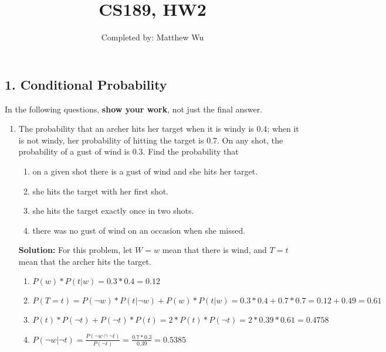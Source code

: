 \documentclass{article}
\title{CS189, HW2}
\author{\vspace{-6ex} Completed by: Matthew Wu}
\date{\vspace{-6ex}}
\newcommand{\solution}{\textbf{Solution: }}
\begin{document}
\maketitle

\subsection*{1. Conditional Probability} In the following questions, \textbf{show your work}, not just the final answer.
\begin{enumerate}[label=(\alph*)]
    \item The probability that an archer hits her target when it is windy is 0.4; when it is not windy, her probability of hitting the target is 0.7. On any shot, the probability of a gust of wind is 0.3. Find the probability that 
    \begin{enumerate}[label=(\roman*)]
        \item on a given shot there is a gust of wind and she hits her target. 
        \item she hits the target with her first shot.
        \item she hits the target exactly once in two shots.
        \item there was no gust of wind on an occasion when she missed. 
    \end{enumerate}
    \begin{mdframed}
    \solution
    For this problem, let $W=w$ mean that there is wind, and $T=t$ mean that the archer hits the target.
    \begin{enumerate}[label=(\roman*)]
    \item $P(w)*P(t|w)=0.3*0.4=0.12$
    \item $P(T=t)=P(\neg w)*P(t|\neg w)+P(w)*P(t|w)=0.3*0.4+0.7*0.7=0.12+0.49=0.61$
    \item $P(t)*P(\neg t) + P(\neg t)*P(t) = 2*P(t)*P(\neg t)=2*0.39*0.61=0.4758$
    \item $P(\neg w|\neg t)=\frac{P(\neg w \cap \neg t)}{P(\neg t)}=\frac{0.7*0.3}{0.39}=0.5385$
    \end{enumerate}
    \end{mdframed}
    

\end{enumerate}
\end{document}
